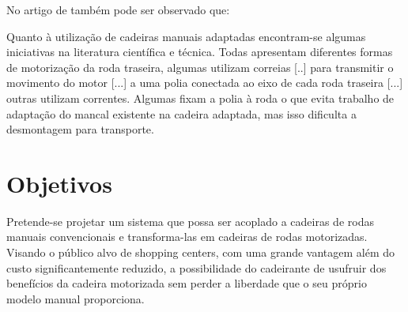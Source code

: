 No artigo de \cite{artigo_rudi} também pode ser observado que:
\begin{citacao}
Quanto à utilização de cadeiras manuais adaptadas encontram-se algumas iniciativas na literatura científica e técnica. Todas apresentam diferentes formas de motorização da roda traseira, algumas utilizam correias [..] para
transmitir o movimento do motor [...] a uma polia conectada ao eixo de cada roda traseira [...] outras utilizam
correntes. Algumas fixam a polia à roda o que evita trabalho de adaptação do mancal existente na cadeira adaptada, mas isso dificulta a desmontagem para transporte.
\end{citacao}


\section{Objetivos}

Pretende-se projetar um sistema que possa ser acoplado a cadeiras de rodas manuais convencionais e transforma-las em cadeiras de rodas motorizadas. Visando o público alvo de shopping centers, com uma grande vantagem além do custo significantemente reduzido, a possibilidade do cadeirante de usufruir dos benefícios da cadeira motorizada sem perder a liberdade que o seu próprio modelo manual proporciona.

